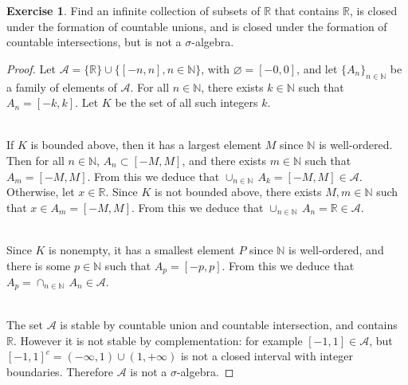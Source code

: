 \documentclass[11pt,a4paper,twoside]{article}
\theoremstyle{definition}
\newcounter{excounter}
\newtheorem{exercise}[excounter]{Exercise}
\begin{document}
\begin{exercise}

  Find an infinite collection of subsets of $\mathbb{R}$ that contains $\mathbb{R}$, is closed
  under the formation of countable unions, and is closed under the formation of countable intersections,
  but is not a $\sigma$-algebra.

\end{exercise}

\begin{proof}

  Let $\mathscr{A} = \{ \mathbb{R} \} \cup \{ [ {-n}, n ], n \in \mathbb{N} \}$, with $\varnothing = [ {-0}, 0 ]$,
  and let $\{ A_n \}_{n \in \mathbb{N}}$ be a family of elements of $\mathscr{A}$.
  For all $n \in \mathbb{N}$, there exists $k \in \mathbb{N}$ such that $A_n = [ {-k}, k ]$.
  Let $K$ be the set of all such integers $k$.

  ~\\
  If $K$ is bounded above, then it has a largest element $M$
  since $\mathbb{N}$ is well-ordered. Then for all $n \in \mathbb{N}$, $A_n \subset [ {-M}, M ]$,
  and there exists $m \in \mathbb{N}$ such that $A_m = [ {-M}, M ]$. From this we deduce that
  $\cup_{n \in \mathbb{N}} \,A_k = [ {-M}, M ] \in \mathscr{A}$.
  Otherwise, let $x \in \mathbb{R}$. Since $K$ is not bounded above, there exists $M, m \in \mathbb{N}$
  such that $x \in A_m = [ {-M}, M ]$. From this we deduce that $\cup_{n \in \mathbb{N}} \,A_n = \mathbb{R} \in \mathscr{A}$.

  ~\\
  Since $K$ is nonempty, it has a smallest element $P$ since $\mathbb{N}$ is well-ordered, and there is some
  $p \in \mathbb{N}$ such that $A_p = [ {-p}, p ]$. From this we deduce that $A_p = \cap_{n \in \mathbb{N}} \,A_n \in \mathscr{A}$.

  ~\\
  The set $\mathscr{A}$ is stable by countable union and countable intersection, and contains $\mathbb{R}$. However
  it is not stable by complementation: for example $[ {-1}, 1 ] \in \mathscr{A}$, but $[ {-1}, 1 ]^c = ( {-\infty}, 1 ) \cup ( 1, {+\infty} )$
  is not a closed interval with integer boundaries. Therefore $\mathscr{A}$ is not a $\sigma$-algebra.

\end{proof}
\end{document}
